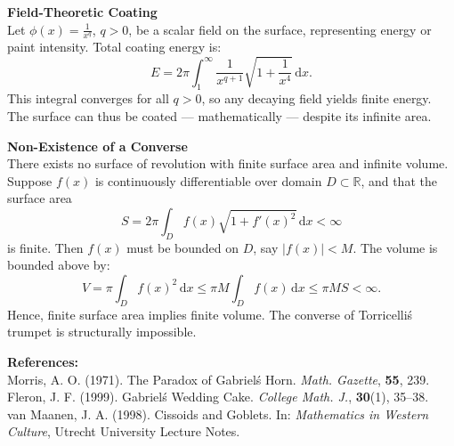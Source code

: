 \begin{technical}
\vspace{0.5em}
\textbf{Field-Theoretic Coating}\\[0.5em]
Let \(\phi(x) = \frac{1}{x^q}\), \(q > 0\), be a scalar field on the surface, representing energy or paint intensity. Total coating energy is:
\[
E = 2\pi \int_{1}^{\infty} \frac{1}{x^{q+1}} \sqrt{1 + \frac{1}{x^4}} \,\mathrm{d}x.
\]
This integral converges for all \(q > 0\), so any decaying field yields finite energy. The surface can thus be coated — mathematically — despite its infinite area.

\vspace{0.5em}
\textbf{Non-Existence of a Converse}\\[0.5em]
There exists no surface of revolution with finite surface area and infinite volume. Suppose \(f(x)\) is continuously differentiable over domain \(D \subset \mathbb{R}\), and that the surface area
\[
S = 2\pi \int_D f(x) \sqrt{1 + f'(x)^2} \, \mathrm{d}x < \infty
\]
is finite. Then \(f(x)\) must be bounded on \(D\), say \(|f(x)| < M\). The volume is bounded above by:
\[
V = \pi \int_D f(x)^2 \, \mathrm{d}x \le \pi M \int_D f(x) \, \mathrm{d}x \le \pi M S < \infty.
\]
Hence, finite surface area implies finite volume. The converse of Torricelli\'s trumpet is structurally impossible.

\vspace{0.5em}
\textbf{References:}\\
Morris, A. O. (1971). The Paradox of Gabriel\'s Horn. \textit{Math. Gazette}, \textbf{55}, 239.\\
Fleron, J. F. (1999). Gabriel\'s Wedding Cake. \textit{College Math. J.}, \textbf{30}(1), 35--38.\\
van Maanen, J. A. (1998). Cissoids and Goblets. In: \textit{Mathematics in Western Culture}, Utrecht University Lecture Notes.
\end{technical}
